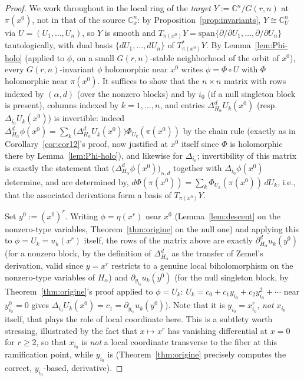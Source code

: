 \documentclass[11pt]{article}
\theoremstyle{remark}
\newcommand{\CC}{\mathbb{C}}
\begin{document}
\begin{proof}
We work throughout in the local ring of the \emph{target} $Y:=\CC^n/G(r,n)$ at $\pi(x^0)$, not in that of the source $\CC^n_x$: by Proposition~\ref{prop:invariants}, $Y\cong\CC^n_U$ via $U=(U_1,\dots,U_n)$, so $Y$ is smooth and $T_{\pi(x^0)}Y=\mathrm{span}\{\partial/\partial U_1,\dots,\partial/\partial U_n\}$ tautologically, with dual basis $\{dU_1,\dots,dU_n\}$ of $T^*_{\pi(x^0)}Y$. By Lemma~\ref{lem:Phi-holo} (applied to $\phi$, on a small $G(r,n)$-stable neighborhood of the orbit of $x^0$), every $G(r,n)$-invariant $\phi$ holomorphic near $x^0$ writes $\phi=\Phi\circ U$ with $\Phi$ holomorphic near $\pi(x^0)$. It suffices to show that the $n\times n$ matrix with rows indexed by $(\alpha,d)$ (over the nonzero blocks) and by $i_0$ (if a null singleton block is present), columns indexed by $k=1,\dots,n$, and entries $\Delta_{H_\alpha}^dU_k(x^0)$ (resp.\ $\Delta_{i_0}U_k(x^0)$) is invertible: indeed $\Delta_{H_\alpha}^d\phi(x^0)=\sum_k\big(\Delta_{H_\alpha}^dU_k(x^0)\big)\Phi_{U_k}(\pi(x^0))$ by the chain rule (exactly as in Corollary~\ref{cor:cor12}'s proof, now justified at $x^0$ itself since $\Phi$ is holomorphic there by Lemma~\ref{lem:Phi-holo}), and likewise for $\Delta_{i_0}$; invertibility of this matrix is exactly the statement that $\big(\Delta_{H_\alpha}^d\phi(x^0)\big)_{\alpha,d}$ together with $\Delta_{i_0}\phi(x^0)$ determine, and are determined by, $d\Phi(\pi(x^0))=\sum_k\Phi_{U_k}(\pi(x^0))\,dU_k$, i.e., that the associated derivations form a basis of $T_{\pi(x^0)}Y$.

Set $y^0:=(x^0)^r$. Writing $\phi=\eta(x^r)$ near $x^0$ (Lemma~\ref{lem:descent} on the nonzero-type variables, Theorem~\ref{thm:origine} on the null one) and applying this to $\phi=U_k=u_k(x^r)$ itself, the rows of the matrix above are exactly $\partial_{H_\alpha}^du_k(y^0)$ (for a nonzero block, by the definition of $\Delta_{H_\alpha}^d$ as the transfer of Zemel's derivation, valid since $y=x^r$ restricts to a genuine local biholomorphism on the nonzero-type variables of $H_\alpha$) and $\partial_{y_{i_0}}u_k(y^0)$ (for the null singleton block, by Theorem~\ref{thm:origine}'s proof applied to $\phi=U_k$: $U_k=c_0+c_1y_{i_0}+c_2y_{i_0}^2+\cdots$ near $y_{i_0}^0=0$ gives $\Delta_{i_0}U_k(x^0)=c_1=\partial_{y_{i_0}}u_k(y^0)$). Note that it is $y_{i_0}=x_{i_0}^r$, \emph{not} $x_{i_0}$ itself, that plays the role of local coordinate here. This is a subtlety worth stressing, illustrated by the fact that $x\mapsto x^r$ has vanishing differential at $x=0$ for $r\ge2$, so that $x_{i_0}$ is \emph{not} a local coordinate transverse to the fiber at this ramification point, while $y_{i_0}$ is (Theorem~\ref{thm:origine} precisely computes the correct, $y_{i_0}$-based, derivative).


\end{proof}
\end{document}
